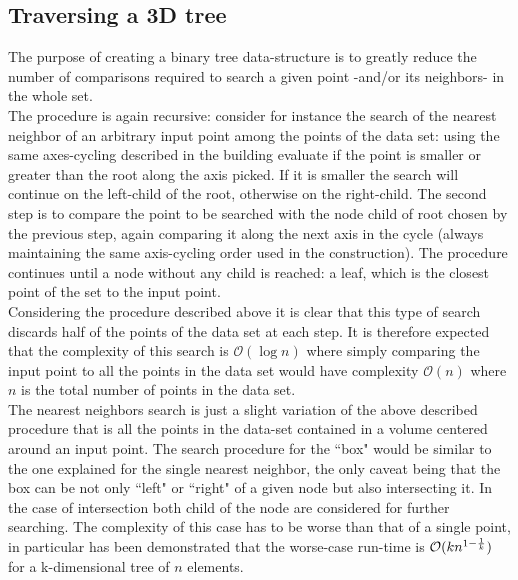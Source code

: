 \subsection{Traversing a 3D tree}
The purpose of creating a binary tree data-structure is to greatly reduce the number of comparisons required to search a given point -and/or its neighbors- in the whole set.\\
The procedure is again recursive: consider for instance the search of the nearest neighbor of an arbitrary input point among the points of the data set: using the same axes-cycling described in the building evaluate if the point is smaller or greater than the root along the axis picked. If it is smaller the search will continue on the left-child of the root, otherwise on the right-child. The second step is to compare the point to be searched with the node child of root chosen by the previous step, again comparing it along the next axis in the cycle (always maintaining the same axis-cycling order used in the construction). The procedure continues until a node without any child is reached: a leaf, which is the closest point of the set to the input point.\\
Considering the procedure described above it is clear that this type of search discards half of the points of the data set at each step. It is therefore expected that the complexity of this search is $\mathcal{O}(\log{} n)$ where simply comparing the input point to all the points in the data set would have complexity $\mathcal{O}(n)$ where $n$ is the total number of points in the data set.\\
The nearest neighbors search is just a slight variation of the above described procedure that is all the points in the data-set contained in a volume centered around an input point. The search procedure for the ``box" would be similar to the one explained for the single nearest neighbor, the only caveat being that the box can be not only ``left" or ``right" of a given node but also intersecting it. In the case of intersection both child of the node are considered for further searching. The complexity of this case has to be worse than that of a single point, in particular has been demonstrated \cite{worst-case-search} that the worse-case run-time is $\mathcal{O}(k n ^{1 - {1\over k}})$ for a k-dimensional tree of $n$ elements.

